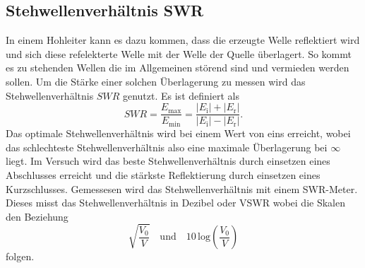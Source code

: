 \subsection{Stehwellenverhältnis SWR}
\label{sec:swr}
In einem Hohleiter kann es dazu kommen, dass die erzeugte Welle reflektiert wird und sich diese refelekterte Welle mit der Welle der Quelle überlagert.
So kommt es zu stehenden Wellen die im Allgemeinen störend sind und vermieden werden sollen.
Um die Stärke einer solchen Überlagerung zu messen wird das Stehwellenverhältnis $SWR$ genutzt.
Es ist definiert als 
\begin{equation}
    SWR = \frac{E _\text{max}}{E _\text{min}} = \frac{\left | E _\text{i} \right | + \left | E _\text{r} \right |}{\left | E _\text{i} \right | - \left | E _\text{r} \right |}.
\end{equation}
Das optimale Stehwellenverhältnis wird bei einem Wert von eins erreicht, wobei das schlechteste Stehwellenverhältnis also eine maximale Überlagerung bei $ \infty $ liegt.
Im Versuch wird das beste Stehwellenverhältnis durch einsetzen eines Abschlusses erreicht und die stärkste Reflektierung durch einsetzen eines Kurzschlusses.
Gemessesen wird das Stehwellenverhältnis mit einem SWR-Meter.
Dieses misst das Stehwellenverhältnis in Dezibel oder VSWR wobei die Skalen den Beziehung
\begin{equation*}
    \sqrt{\frac{V_0}{V}}  \quad \text{und}  \quad 10 \, \text{log} \left ( \frac{V_0}{V}\right )  
\end{equation*}
folgen.

